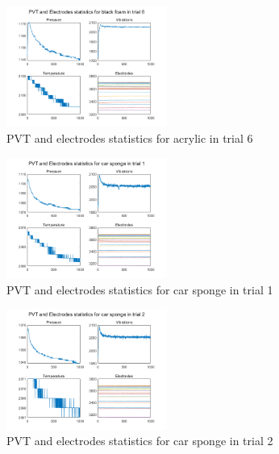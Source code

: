 \documentclass[10pt,twocolumn,letterpaper]{article}
\begin{document}
\begin{figure}[h]
\begin{center}
   \includegraphics[width=0.47\textwidth]{part1_6}
\end{center}
   \caption{PVT and electrodes statistics for acrylic in trial 6}
\label{fig:6}
\end{figure}

\begin{figure}[h]
\begin{center}
   \includegraphics[width=0.47\textwidth]{part1_7}
\end{center}
   \caption{PVT and electrodes statistics for car sponge in trial 1}
\label{fig:7}
\end{figure}

\begin{figure}[h]
\begin{center}
   \includegraphics[width=0.47\textwidth]{part1_8}
\end{center}
   \caption{PVT and electrodes statistics for car sponge in trial 2}
\label{fig:8}
\end{figure}
\end{document}
